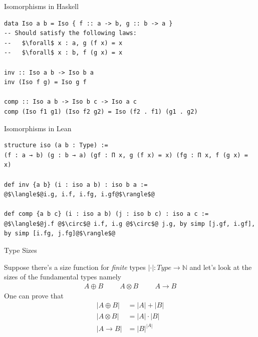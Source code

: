 \documentclass[pdf]{beamer}
\begin{document}
\begin{frame}[fragile]{Isomorphisms in Haskell}
  \begin{verbatim}
data Iso a b = Iso { f :: a -> b, g :: b -> a }
-- Should satisfy the following laws:
--   $\forall$ x : a, g (f x) = x
--   $\forall$ x : b, f (g x) = x

inv :: Iso a b -> Iso b a
inv (Iso f g) = Iso g f

comp :: Iso a b -> Iso b c -> Iso a c
comp (Iso f1 g1) (Iso f2 g2) = Iso (f2 . f1) (g1 . g2)
  \end{verbatim}
\end{frame}

\begin{frame}[fragile]{Isomorphisms in Lean}
  \begin{verbatim}
structure iso (a b : Type) :=
(f : a → b) (g : b → a) (gf : Π x, g (f x) = x) (fg : Π x, f (g x) = x)

def inv {a b} (i : iso a b) : iso b a :=
@$\langle$@i.g, i.f, i.fg, i.gf@$\rangle$@

def comp {a b c} (i : iso a b) (j : iso b c) : iso a c :=
@$\langle$@j.f @$\circ$@ i.f, i.g @$\circ$@ j.g, by simp [j.gf, i.gf], by simp [i.fg, j.fg]@$\rangle$@
  \end{verbatim}
\end{frame}

\begin{frame}{Type Sizes}
  \begin{outline}
    \1 Suppose there's a size function for \textit{finite} types $|\cdot| : Type \to \mathbb{N}$ and let's look at the sizes of the fundamental types namely
    \begin{align*}
      A \oplus B \hspace{1cm} A \otimes B \hspace{1cm} A \to B
    \end{align*}
    \1 One can prove that
    \begin{align*}
      |A \oplus B| &= |A| + |B| \\
      |A \otimes B| &= |A| \cdot |B| \\
      |A \to B| &= |B|^{|A|}
    \end{align*}
  \end{outline}
\end{frame}
\end{document}
